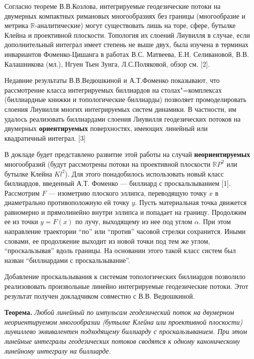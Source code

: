 
\vzmscaption
Согласно теореме В.В.Козлова, интегрируемые геодезические потоки на двумерных компактных римановых многообразиях без границы (многообразие и метрика $\mathbb{R}$-аналитические) могут существовать лишь на торе, сфере, бутылке Клейна и проективной плоскости. Топология их слоений Лиувилля в случае, если дополнительный интеграл имеет степень не выше двух, была изучена в терминах инвариантов Фоменко-Цишанга в работах В.С. Матвеева, Е.Н. Селивановой, В.В. Калашникова (мл.), Нгуен Тьен Зунга, Л.С.Поляковой, обзор см. [2].

Недавние результаты В.В.Ведюшкиной и А.Т.Фоменко показывают, что рассмотрение класса интегрируемых биллиардов на столах"=комплексах (биллиардные книжки и топологические биллиарды) позволяет промоделировать слоения Лиувилля многих интегрируемых систем динамики. В частности, им удалось реализовать биллиардами слоения Лиувилля геодезических потоков на двумерных \textbf{ориентируемых} поверхностях, имеющих линейный или квадратичный интеграл. [3]

В докладе будет представлено развитие этой работы на случай \textbf{неориентируемых} многообразий (будут рассмотрены потоки на проективной плоскости $\mathbb{R}P^2$ или бутылке Клейна $Kl^2$). Для этого понадобилось использовать новый класс биллиардов, введенный А.Т. Фоменко — биллиард с проскальзыванием [1]. Рассмотрим $F$ --- изометрию плоского эллипса, переводящую точку $x$ в диаметрально противоположную ей точку $y.$ Пусть материальная точка движется равномерно и прямолинейно внутри эллипса и попадает на границу. Продолжим ее из точки $y=F(x)$ по лучу, выходящему из нее под углом $\alpha$. При этом направление траектории ``по'' или ``против'' часовой стрелки сохранится. Иными словами, ее продолжение выходит из новой точки под тем же углом, ``проскальзывая'' вдоль границы. На основании этого такой класс систем был назван ``биллиардами с проскальзывание''.

Добавление проскальзывания к системам топологических биллиардов позволило реализововать произвольные линейно интегрируемые геодезические потоки. Этот результат получен докладчиком совместно с В.В. Ведюшкиной.

{\bf Теорема.} {\it Любой линейный по импульсам геодезический поток на двумерном неориентируемом многообразии (бутылке Клейна или проективной плоскости) лиувиллево эквивалентен подходящему биллиарду с проскальзыванием. При этом линейные интегралы геодезических потоков сводятся к одному каноническому линейному интегралу на биллиарде}.

